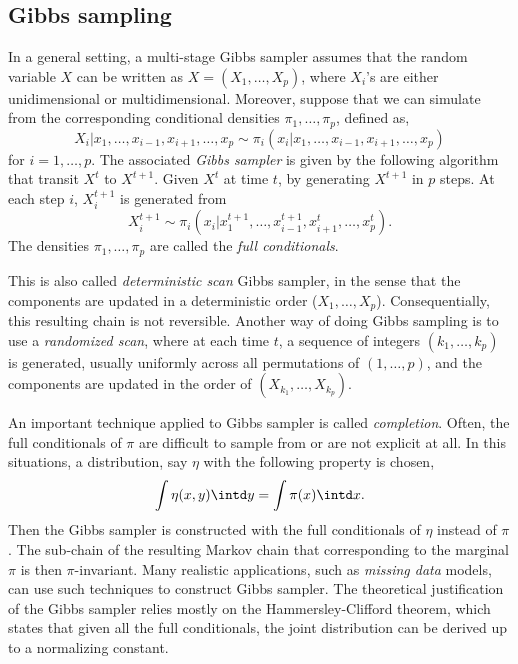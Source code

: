 \subsection{Gibbs sampling}
\label{sub:Gibbs sampling}

In a general setting, a multi-stage Gibbs sampler assumes that the random
variable $X$ can be written as $X = (X_1,\dots,X_p)$, where $X_i$'s are either
unidimensional or multidimensional. Moreover, suppose that we can simulate
from the corresponding conditional densities $\pi_1,\dots,\pi_p$, defined as,
\begin{equation}
  X_i|x_1,\dots,x_{i-1},x_{i+1},\dots,x_p
  \sim \pi_i(x_i|x_1,\dots,x_{i-1},x_{i+1},\dots,x_p)
\end{equation}
for $i = 1,\dots,p$. The associated \emph{Gibbs sampler} is given by the
following algorithm that transit $X^t$ to $X^{t+1}$. Given $X^t$ at time $t$,
by generating $X^{t+1}$ in $p$ steps. At each step $i$, $X_i^{t+1}$ is
generated from
\begin{equation}
  X_i^{t+1} \sim
  \pi_i(x_i|x_1^{t+1},\dots,x_{i-1}^{t+1},x_{i+1}^t,\dots,x_p^t).
\end{equation}
The densities $\pi_1,\dots,\pi_p$ are called the \emph{full conditionals}.

This is also called \emph{deterministic scan} Gibbs sampler, in the sense that
the components are updated in a deterministic order ($X_1,\dots,X_p$).
Consequentially, this resulting chain is not reversible. Another way of doing
Gibbs sampling is to use a \emph{randomized scan}, where at each time $t$, a
sequence of integers $(k_1,\dots,k_p)$ is generated, usually uniformly across
all permutations of $(1,\dots,p)$, and the components are updated in the order
of $(X_{k_1},\dots,X_{k_p})$.

An important technique applied to Gibbs sampler is called \emph{completion}.
Often, the full conditionals of $\pi$ are difficult to sample from or are not
explicit at all. In this situations, a distribution, say $\eta$ with the
following property is chosen,
\begin{equation}
  \int\eta(x,y)\intd y = \int\pi(x)\intd x.
\end{equation}
Then the Gibbs sampler is constructed with the full conditionals of $\eta$
instead of $\pi$. The sub-chain of the resulting Markov chain that
corresponding to the marginal $\pi$ is then $\pi$-invariant. Many realistic
applications, such as \emph{missing data} models, can use such techniques to
construct Gibbs sampler. The theoretical justification of the Gibbs sampler
relies mostly on the Hammersley-Clifford theorem, which states that given all
the full conditionals, the joint distribution can be derived up to a
normalizing constant.

